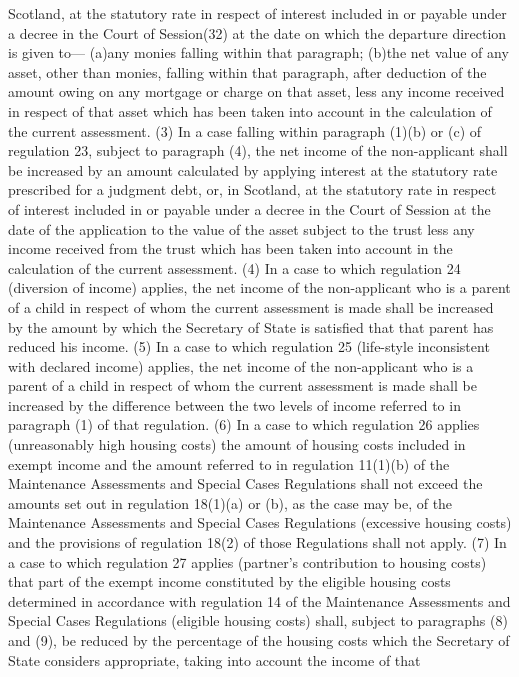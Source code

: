 \documentclass[a4paper]{article}
\begin{document}
Scotland, at the statutory rate in respect of interest included in or payable
under a decree in the Court of Session(32) at the date on which the departure
direction is given to—
(a)any monies falling within that paragraph;
(b)the net value of any asset, other than monies, falling within that paragraph,
after deduction of the amount owing on any mortgage or charge on that asset,
less any income received in respect of that asset which has been taken into
account in the calculation of the current assessment.
(3) In a case falling within paragraph (1)(b) or (c) of regulation 23, subject
to paragraph (4), the net income of the non-applicant shall be increased by an
amount calculated by applying interest at the statutory rate prescribed for a
judgment debt, or, in Scotland, at the statutory rate in respect of interest
included in or payable under a decree in the Court of Session at the date of the
application to the value of the asset subject to the trust less any income
received from the trust which has been taken into account in the calculation of
the current assessment.
(4) In a case to which regulation 24 (diversion of income) applies, the net
income of the non-applicant who is a parent of a child in respect of whom the
current assessment is made shall be increased by the amount by which the
Secretary of State is satisfied that that parent has reduced his income.
(5) In a case to which regulation 25 (life-style inconsistent with declared
income) applies, the net income of the non-applicant who is a parent of a child
in respect of whom the current assessment is made shall be increased by the
difference between the two levels of income referred to in paragraph (1) of that
regulation.
(6) In a case to which regulation 26 applies (unreasonably high housing costs)
the amount of housing costs included in exempt income and the amount referred to
in regulation 11(1)(b) of the Maintenance Assessments and Special Cases
Regulations shall not exceed the amounts set out in regulation 18(1)(a) or (b),
as the case may be, of the Maintenance Assessments and Special Cases Regulations
(excessive housing costs) and the provisions of regulation 18(2) of those
Regulations shall not apply.
(7) In a case to which regulation 27 applies (partner’s contribution to housing
costs) that part of the exempt income constituted by the eligible housing costs
determined in accordance with regulation 14 of the Maintenance Assessments and
Special Cases Regulations (eligible housing costs) shall, subject to paragraphs
(8) and (9), be reduced by the percentage of the housing costs which the
Secretary of State considers appropriate, taking into account the income of that
\end{document}
